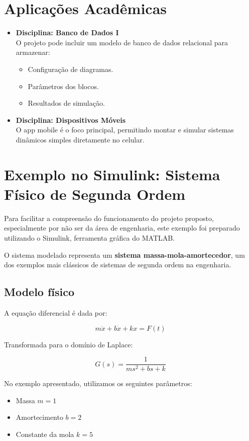 \documentclass[12pt]{article}
\begin{document}
\section*{Aplicações Acadêmicas}

\begin{itemize}
    \item \textbf{Disciplina: Banco de Dados I} \\
    O projeto pode incluir um modelo de banco de dados relacional para armazenar:
    \begin{itemize}
        \item Configuração de diagramas.
        \item Parâmetros dos blocos.
        \item Resultados de simulação.
    \end{itemize}

    \item \textbf{Disciplina: Dispositivos Móveis} \\
    O app mobile é o foco principal, permitindo montar e simular sistemas dinâmicos simples diretamente no celular.
\end{itemize}

\section*{Exemplo no Simulink: Sistema Físico de Segunda Ordem}

Para facilitar a compreensão do funcionamento do projeto proposto, especialmente por não ser da área de engenharia, este exemplo foi preparado utilizando o Simulink, ferramenta gráfica do MATLAB.

O sistema modelado representa um \textbf{sistema massa-mola-amortecedor}, um dos exemplos mais clássicos de sistemas de segunda ordem na engenharia.

\subsection*{Modelo físico}

A equação diferencial é dada por:

\[
m \ddot{x} + b \dot{x} + kx = F(t)
\]

Transformada para o domínio de Laplace:

\[
G(s) = \frac{1}{ms^2 + bs + k}
\]

No exemplo apresentado, utilizamos os seguintes parâmetros:
\begin{itemize}
    \item Massa \( m = 1 \)
    \item Amortecimento \( b = 2 \)
    \item Constante da mola \( k = 5 \)
\end{itemize}
\end{document}
